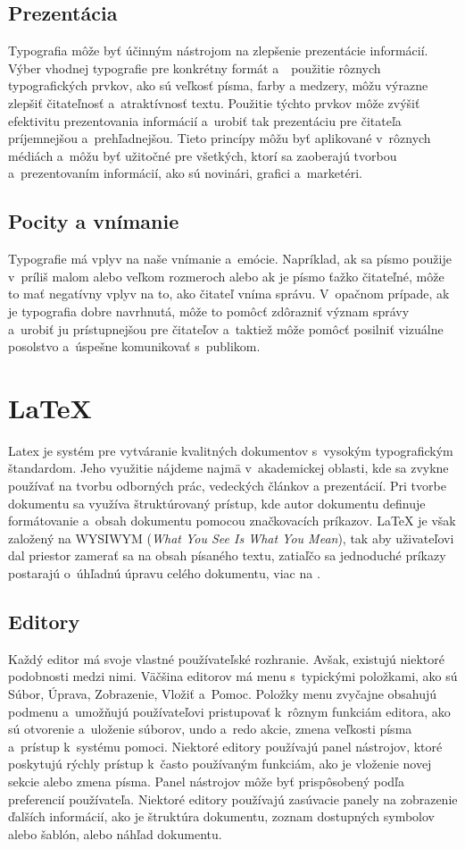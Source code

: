 \documentclass[a4paper, 11pt]{article}
\begin{document}
\subsection{Prezentácia}
Typografia môže byť účinným nástrojom na zlepšenie prezentácie informácií. Výber vhodnej typografie pre konkrétny formát a~~použitie rôznych typografických prvkov, ako sú veľkosť písma, farby a medzery, môžu výrazne zlepšiť čitateľnosť a~atraktívnosť textu. Použitie týchto prvkov môže zvýšiť efektivitu prezentovania informácií a~urobiť tak prezentáciu pre čitateľa príjemnejšou a~prehľadnejšou. Tieto princípy môžu byť aplikované v~rôznych médiách a~môžu byť užitočné pre všetkých, ktorí sa zaoberajú tvorbou a~prezentovaním informácií, ako sú novinári, grafici a~marketéri\cite{NovotnaMaria2019}. 

\subsection{Pocity a vnímanie}
Typografie má vplyv na naše vnímanie a~emócie. Napríklad, ak sa písmo použije v~príliš malom alebo veľkom rozmeroch alebo ak je písmo ťažko čitateľné, môže to mať negatívny vplyv na to, ako čitateľ vníma správu. V~opačnom prípade, ak je typografia dobre navrhnutá, môže to pomôcť zdôrazniť význam správy a~urobiť ju prístupnejšou pre čitateľov a~taktiež môže pomôcť posilniť vizuálne posolstvo a~úspešne komunikovať s~publikom\cite{Lupton}. 

\section{\LaTeX}
Latex je systém pre vytváranie kvalitných dokumentov s~vysokým typografickým štandardom. Jeho využitie nájdeme najmä v~akademickej oblasti, kde sa zvykne používať na tvorbu odborných prác, vedeckých článkov a prezentácií. Pri tvorbe dokumentu sa využíva štruktúrovaný prístup, kde autor dokumentu definuje formátovanie a~obsah dokumentu pomocou značkovacích príkazov. \LaTeX{} je však založený na WYSIWYM (\emph{What You See Is What You Mean}), tak aby uživateľovi dal priestor zamerať sa na obsah písaného textu, zatiaľčo sa jednoduché príkazy postarajú o~úhľadnú úpravu celého dokumentu, viac na \cite{Overleaf}.

\subsection{Editory}
Každý editor má svoje vlastné používateľské rozhranie. Avšak, existujú niektoré podobnosti medzi nimi. Väčšina editorov má menu s~typickými položkami, ako sú Súbor, Úprava, Zobrazenie, Vložiť a~Pomoc. Položky menu zvyčajne obsahujú podmenu a~umožňujú používateľovi pristupovať k~rôznym funkciám editora, ako sú otvorenie a~uloženie súborov, undo a~redo akcie, zmena veľkosti písma a~prístup k~systému pomoci. Niektoré editory používajú panel nástrojov, ktoré poskytujú rýchly prístup k~často používaným funkciám, ako je vloženie novej sekcie alebo zmena písma. Panel nástrojov môže byť prispôsobený podľa preferencií používateľa. Niektoré editory používajú zasúvacie panely na zobrazenie ďalších informácií, ako je štruktúra dokumentu, zoznam dostupných symbolov alebo šablón, alebo náhľad dokumentu\cite{HorejsiTomas2017}.
\end{document}
